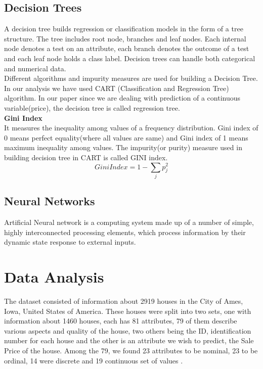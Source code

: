 \documentclass[fleqn,10pt]{SelfArx} %
\begin{document}
	\subsection{Decision Trees}
	A decision tree builds regression or classification models in the form of a tree structure. The tree includes root node, branches and leaf nodes. Each internal node denotes a test on an attribute, each branch denotes the outcome of a test and each leaf node holds a class label. Decision trees can handle both categorical and numerical data. \\
	Different algorithms and impurity measures are used for building a Decision Tree. In our analysis we have used CART (Classification and Regression Tree) algorithm. In our paper since we are dealing with prediction of a continuous  variable(price), the decision tree is called regression tree.\\
	\textbf{Gini Index}\\
	It measures the inequality among values of a frequency distribution. Gini index of 0 means perfect equality(where all values are same) and Gini index of 1 means maximum inequality among values. The impurity(or purity) measure used in building decision tree in CART is called GINI index.
	\[Gini Index = 1 - \sum_{j}p_j^2 \]
	
	\subsection{Neural Networks}
	Artificial Neural network is a computing system made up of a number of simple, highly interconnected processing elements, which process information by their dynamic state response to external inputs.
	
	\section{Data Analysis}
	The dataset consisted of information about 2919 houses in the City of Ames, Iowa, United States of America. These houses were split into two sets, one  with information about 1460 houses, each has 81 attributes, 79 of them describe various aspects and quality of the house, two others being the ID, identification number for each house and the other is an attribute we wish to predict, the Sale Price of the house. Among the 79, we found 23 attributes to be nominal, 23 to be ordinal, 14 were discrete and 19 continuous set of values \cite{dataset}.\\
	
\end{document}
